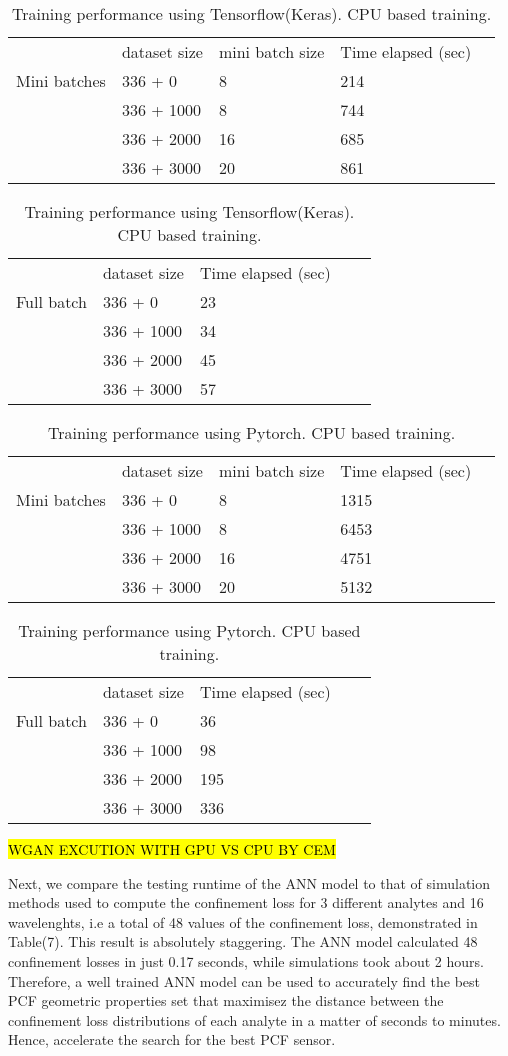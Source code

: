 \documentclass[draft, 10pt]{IEEEtran}
\begin{document}
\begin{table}[h]
\begin{tabular}{lllll}
    & dataset size & mini batch size & Time elapsed (sec) \\
Mini batches    &336 + 0 & 8 & 214 & \\
    &336 + 1000 & 8 & 744 & \\
    &336 + 2000 & 16 & 685  & \\ 
    &336 + 3000 & 20 & 861  & \\
\end{tabular}
\begin{tabular}{lllll}
   & dataset size & Time elapsed (sec) \\
Full batch    &336 + 0 &  23 & \\
    &336 + 1000 &  34 & \\
    &336 + 2000 &  45 & \\ 
    &336 + 3000 &  57 & \\
\end{tabular}
\caption{Training performance using Tensorflow(Keras). CPU based training.}
\end{table}
\begin{table}[h]
\begin{tabular}{lllll}
 & dataset size & mini batch size & Time elapsed (sec) \\
Mini batches    & 336 + 0 & 8 & 1315 & \\
    & 336 + 1000 & 8 & 6453  & \\
    & 336 + 2000 & 16 & 4751  & \\ 
    & 336 + 3000 & 20 & 5132 & \\
\end{tabular}
\begin{tabular}{lllll}
   &dataset size & Time elapsed (sec) \\
   Full batch &336 + 0 &  36  & \\
    & 336 + 1000 &  98  & \\
    & 336 + 2000 &  195  & \\ 
    & 336 + 3000 &  336  & \\
\end{tabular}
\caption{Training performance using Pytorch. CPU based training.}
\end{table}

\hl{WGAN EXCUTION WITH GPU VS CPU BY CEM}

Next, we compare the testing runtime of the ANN model to that of simulation methods used to compute the confinement loss for 3 different analytes and 16 wavelenghts, i.e a total of 48 values of the confinement loss, demonstrated in Table(7). This result is absolutely staggering. The ANN model calculated 48 confinement losses in just 0.17 seconds, while simulations took about 2 hours. Therefore, a well trained ANN model can be used to accurately find the best PCF geometric properties set that maximisez the distance between the confinement loss distributions of each analyte in a matter of seconds to minutes. Hence, accelerate the search for the best PCF sensor.
\end{document}
